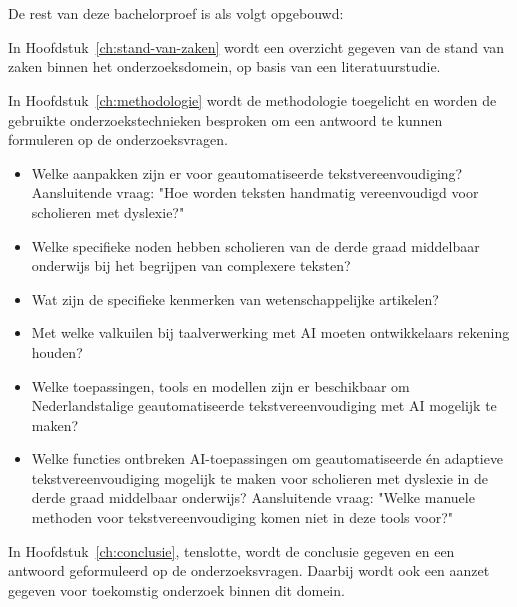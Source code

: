 
\section{}%
\label{sec:opzet-bachelorproef}


De rest van deze bachelorproef is als volgt opgebouwd:

In Hoofdstuk~\ref{ch:stand-van-zaken} wordt een overzicht gegeven van de stand van zaken binnen het onderzoeksdomein, op basis van een literatuurstudie.

In Hoofdstuk~\ref{ch:methodologie} wordt de methodologie toegelicht en worden de gebruikte onderzoekstechnieken besproken om een antwoord te kunnen formuleren op de onderzoeksvragen.


\begin{itemize}
	\item Welke aanpakken zijn er voor geautomatiseerde tekstvereenvoudiging? Aansluitende vraag: "Hoe worden teksten handmatig vereenvoudigd voor scholieren met dyslexie?"
	\item Welke specifieke noden hebben scholieren van de derde graad middelbaar onderwijs bij het begrijpen van complexere teksten?
	\item Wat zijn de specifieke kenmerken van wetenschappelijke artikelen? 
	\item Met welke valkuilen bij taalverwerking met AI moeten ontwikkelaars rekening houden?
	\item Welke toepassingen, tools en modellen zijn er beschikbaar om Nederlandstalige geautomatiseerde tekstvereenvoudiging met AI mogelijk te maken?
	\item Welke functies ontbreken AI-toepassingen om geautomatiseerde én adaptieve tekstvereenvoudiging mogelijk te maken voor \newline scholieren met dyslexie in de derde graad \newline middelbaar onderwijs? Aansluitende vraag: "Welke manuele methoden voor tekstvereenvoudiging komen niet in deze tools voor?"
\end{itemize}

In Hoofdstuk~\ref{ch:conclusie}, tenslotte, wordt de conclusie gegeven en een antwoord geformuleerd op de onderzoeksvragen. Daarbij wordt ook een aanzet gegeven voor toekomstig onderzoek binnen dit domein.